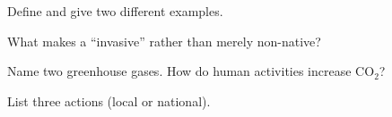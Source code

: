 \begin{exercise}[$\star$]\label{exo:g7:impact:2}
Define  and give two different examples.
\end{exercise}

\begin{exercise}[$\star$]\label{exo:g7:impact:3}
What makes a  ``invasive'' rather than merely non-native?
\end{exercise}

\begin{exercise}[$\star$]\label{exo:g7:impact:4}
Name two greenhouse gases. How do human activities increase $\mathrm{CO_2}$?
\end{exercise}

\begin{exercise}[$\star$]\label{exo:g7:impact:5}
List three  actions (local or national).
\end{exercise}

